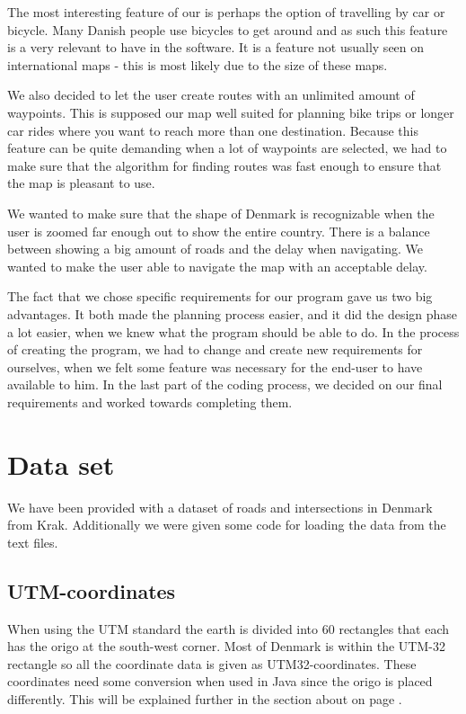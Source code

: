 The most interesting feature of our  is perhaps the
option of travelling by car or bicycle. Many Danish
people use bicycles to get around and as such this feature is a very relevant
to have in the software. It is a feature not usually seen on
international maps - this is most likely due to the size of these maps.

We also decided to let the user create routes with an unlimited amount of
waypoints. This is supposed our map well suited for planning bike trips or
longer car rides where you want to reach more than one destination. Because this
feature can be quite demanding when a lot of waypoints are selected, we had to
make sure that the algorithm for finding routes was fast enough to ensure that the 
map is pleasant to use.

We wanted to make sure that the shape of Denmark is recognizable when
the user is zoomed far enough out to show the entire country. There is a balance between
showing a big amount of roads and the delay when navigating. We wanted to make
the user able to navigate the map with an acceptable delay. 

The fact that we chose specific requirements for our program gave us two big
advantages. It both made the planning process easier, and it did the design phase a lot 
easier, when we knew what the program should be able to do. In the process of creating the
program, we had to change and create new requirements for ourselves, when we
felt some feature was necessary for the end-user to have available to him. In
the last part of the coding process, we decided on our final requirements and worked towards completing them. 

\section{Data set}
\label{BG-DS}
We have been provided with a dataset of roads and intersections in Denmark 
from Krak. Additionally we were given some code for loading the data from the 
text files.

\subsection{UTM-coordinates}
\label{BG-DS-UTM}
When using the UTM standard the earth is divided into 60 rectangles that each 
has the origo at the south-west corner. Most of Denmark is within the UTM-32 
rectangle so all the coordinate data is given as UTM32-coordinates.
These coordinates need some conversion when used in Java since the origo is placed 
differently. This will be explained further in the section about 
on page \pageref{UTM-conversion}.


